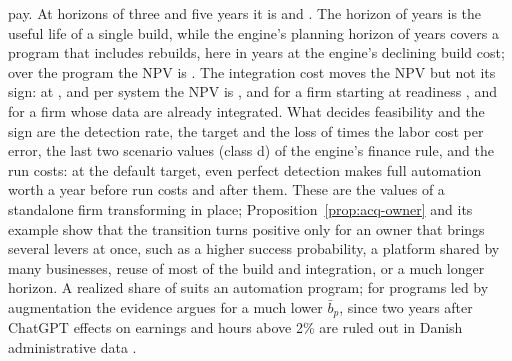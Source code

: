 pay. At horizons of three and five years it is \icNPVthThree{} and \icNPVthFive. The horizon of \icTh{} years is the useful life of a single build, while the engine's planning horizon of \icThEngine{} years covers a program that includes rebuilds, here in years \icRebuilds{} at the engine's declining build cost; over the program the NPV is \icNPVprogram. The integration cost moves the NPV but not its sign: at \icIntLow, \icIntCost{} and \icIntHigh{} per system the NPV is \icNPVaLow, \icNPVaDef{} and \icNPVaHigh{} for a firm starting at readiness \icIotaLow, and \icNPVb{} for a firm whose data are already integrated. What decides feasibility and the sign are the detection rate, the \icQbarHigh{} target and the loss of \icLmultReg{} times the labor cost per error, the last two scenario values (class d) of the engine's finance rule, and the run costs: at the default target, even perfect detection makes full automation worth \icDetWdone{} a year before run costs and \icDetWdoneRun{} after them. These are the values of a standalone firm transforming in place; Proposition~\ref{prop:acq-owner} and its example show that the transition turns positive only for an owner that brings several levers at once, such as a higher success probability, a platform shared by many businesses, reuse of most of the build and integration, or a much longer horizon. A realized share of \icBbar{} suits an automation program; for programs led by augmentation the evidence argues for a much lower $\bar b_p$, since two years after ChatGPT effects on earnings and hours above 2\% are ruled out in Danish administrative data \citep{humlum2025still}.

